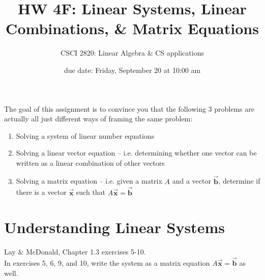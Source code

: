 \documentclass[12pt]{article}
\title{HW 4F: Linear Systems, Linear Combinations, \& Matrix Equations}
\author{CSCI 2820: Linear Algebra \& CS applications }
\date{due date: Friday, September 20 at 10:00 am}
\newcommand{\vect}[1]{\Vec{\textbf{#1}}}
\theoremstyle{definition}
\begin{document}
\maketitle
\renewcommand{\thefootnote}{\fnsymbol{footnote}}

The goal of this assignment is to convince you that the following 3 problems are actually all just different ways of framing the same problem:
\begin{enumerate}
    \item Solving a system of linear number equations
    \item Solving a linear vector equation -- i.e. determining whether one vector can be written as a linear combination of other vectors
    \item Solving a matrix equation -- i.e. given a matrix $A$ and a vector $\vect{b}$, determine if there is a vector $\vect{x}$ such that $A\vect{x} = \vect{b}$
\end{enumerate}

\newpage
\section{Understanding Linear Systems}
Lay \& McDonald, Chapter 1.3 exercises 5-10. \\

In exercises 5, 6, 9, and 10, write the system as a matrix equation $A \vect{x} = \vect{b}$ as well. 
\end{document}
